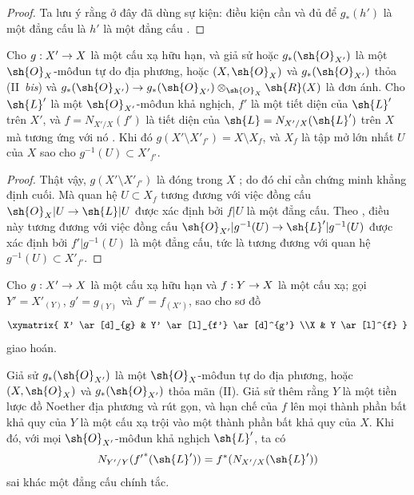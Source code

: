 \documentclass[oneside,10pt]{amsart}
\makeatletter
\newcommand{\ega@arrow}[2]{\mathchoice{#1}{#2}{#2}{#2}}
\renewcommand{\to}{\ega@arrow{\longrightarrow}{\rightarrow}}
\newcommand{\oldpage}[2][]{\marginnote{\normalfont\footnotesize\textbf{#1}~|~#2}\ignorespaces}
\let\EGAOriginalLabel\label
\renewcommand{\label}[1]{\phantomsection\EGAOriginalLabel{#1}}
\makeatother
\begin{document}
\begin{proof}
Ta lưu ý rằng ở đây đã dùng sự kiện: điều kiện cần và đủ để $g_*(h')$ là một đẳng cấu là $h'$ là một đẳng cấu .
\end{proof}

\begin{corollary}[6.5.7]
\label{II.6.5.7}
Cho $g:X'\to X$ là một cấu xạ hữu hạn, và giả sử hoặc $g_*(\sh{O}_{X'})$ là một $\sh{O}_X$-môđun tự do địa phương, hoặc $(X,\sh{O}_X)$ và $g_*(\sh{O}_{X'})$ thỏa (II~\emph{bis}) và $g_*(\sh{O}_{X'})\to g_*(\sh{O}_{X'})\otimes_{\sh{O}_X}\sh{R}(X)$ là đơn ánh.
Cho $\sh{L}'$ là một $\sh{O}_{X'}$-môđun khả nghịch, $f'$ là một tiết diện của $\sh{L}'$ trên $X'$, và $f=N_{X'/X}(f')$ là tiết diện của $\sh{L}=N_{X'/X}(\sh{L}')$ trên $X$ mà
\oldpage[II]{130}
tương ứng với nó .
Khi đó $g(X'\setminus X'_{f'})=X\setminus X_f$, và $X_f$ là tập mở lớn nhất $U$ của $X$ sao cho $g^{-1}(U)\subset X'_{f'}$.
\end{corollary}

\begin{proof}
Thật vậy, $g(X'\setminus X'_{f'})$ là đóng trong $X$ ;
do đó chỉ cần chứng minh khẳng định cuối.
Mà quan hệ $U\subset X_f$ tương đương với việc đồng cấu $\sh{O}_X|U\to\sh{L}|U$ được xác định bởi $f|U$ là một đẳng cấu.
Theo , điều này tương đương với việc đồng cấu $\sh{O}_{X'}|g^{-1}(U)\to\sh{L}'|g^{-1}(U)$ được xác định bởi $f'|g^{-1}(U)$ là một đẳng cấu, tức là tương đương với quan hệ $g^{-1}(U)\subset X'_{f'}$.
\end{proof}

\begin{proposition}[6.5.8]
\label{II.6.5.8}
Cho $g:X'\to X$ là một cấu xạ hữu hạn và $f:Y\to X$ là một cấu xạ;
gọi $Y'=X'_{(Y)}$, $g'=g_{(Y)}$ và $f'=f_{(X')}$, sao cho sơ đồ
\[
  \xymatrix{
    X' \ar[d]_{g}
    & Y' \ar[l]_{f'} \ar[d]^{g'}
  \\X
    & Y \ar[l]^{f}
  }
\]
giao hoán.

Giả sử $g_*(\sh{O}_{X'})$ là một $\sh{O}_X$-môđun tự do địa phương, hoặc $(X,\sh{O}_X)$ và $g_*(\sh{O}_{X'})$ thỏa mãn (II).
Giả sử thêm rằng $Y$ là một tiền lược đồ Noether địa phương và rút gọn, và hạn chế của $f$ lên mọi thành phần bất khả quy của $Y$ là một cấu xạ trội vào một thành phần bất khả quy của $X$.
Khi đó, với mọi $\sh{O}_{X'}$-môđun khả nghịch $\sh{L}'$, ta có
\[
  N_{Y'/Y}({f'}^*(\sh{L}')) = f^*(N_{X'/X}(\sh{L}'))
\]
sai khác một đẳng cấu chính tắc.
\end{proposition}
\end{document}
